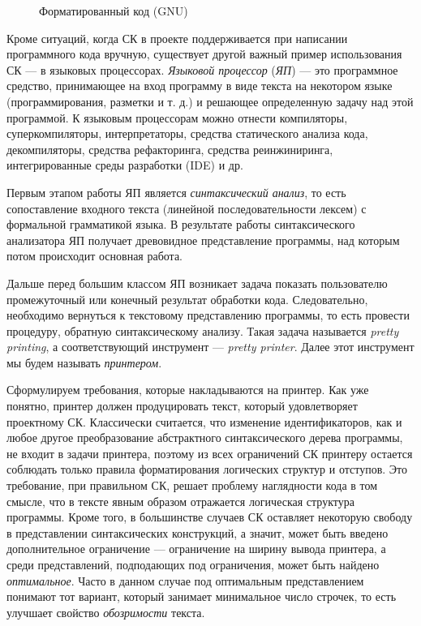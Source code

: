 \begin{figure}[h!]
	\centering
	
  \caption{Форматированный код (GNU)}
	\label{fig:wikiExGNU}
\end{figure}

Кроме ситуаций, когда СК в проекте поддерживается при написании
программного кода вручную, существует другой важный пример использования СК ---
в языковых процессорах. \emph{Языковой процессор} (\emph{ЯП}) ---
это программное средство, принимающее на вход программу в виде текста
на некотором языке (программирования, разметки и т. д.) и решающее
определенную задачу над этой программой. К языковым процессорам можно
отнести компиляторы, суперкомпиляторы, интерпретаторы,
средства статического анализа кода, декомпиляторы, средства рефакторинга,
средства реинжиниринга, интегрированные среды разработки (IDE) и др.

Первым этапом работы ЯП является \emph{синтаксический анализ}, то есть
сопоставление входного текста (линейной последовательности лексем) с формальной
грамматикой языка. В результате работы синтаксического анализатора ЯП получает
древовидное представление программы, над которым потом происходит основная работа.

Дальше перед большим классом ЯП возникает задача показать пользователю
промежуточный или конечный результат обработки кода.
Следовательно, необходимо вернуться к текстовому представлению программы,
то есть провести процедуру, обратную синтаксическому анализу. Такая задача
называется \emph{pretty printing}, а соответствующий инструмент ---
\emph{pretty printer}. Далее этот инструмент мы будем называть
\emph{принтером}.

Сформулируем требования, которые накладываются на принтер.
Как уже понятно, принтер должен
продуцировать текст, который удовлетворяет проектному СК.
Классически считается, что изменение идентификаторов, как и любое другое
преобразование абстрактного синтаксического дерева программы, не входит в
задачи принтера, поэтому из всех ограничений СК принтеру остается 
соблюдать только правила форматирования логических структур и отступов.
Это требование, при правильном СК, решает проблему наглядности кода в том смысле,
что в тексте явным образом отражается логическая структура программы.
Кроме того, в большинстве случаев СК оставляет некоторую свободу в представлении
синтаксических конструкций, а значит, может быть введено дополнительное
ограничение --- ограничение на ширину вывода принтера, а среди 
представлений, подподающих под ограничения, может быть
найдено \emph{оптимальное}. Часто в данном случае под
оптимальным представлением понимают тот вариант,
который занимает минимальное число строчек,
то есть улучшает свойство \emph{обозримости} текста.

